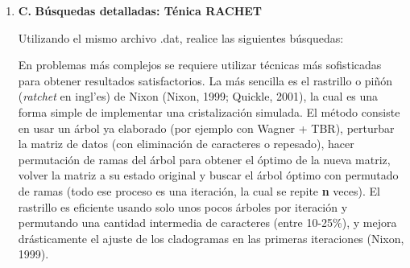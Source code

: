 \begin{itemize}
\begin{enumerate}
 
 
\subsubsection*{Preguntas}
Utilice un manejador gr\'afico que le permita visualizar la tendencia en los datos obtenidos.

¿Encontr\'o alguna tendencia en t\'erminos de tiempos o costos,  al aumentar el n\'umero de replicas?\\


\item{\textbf{C. }}\textbf{B\'usquedas detalladas: T\'enica RACHET}

Utilizando el mismo archivo .dat,  realice las siguientes b\'usquedas:

 \begin{table}[H]
 \centering
 \end{table}

En problemas m\'as complejos se requiere utilizar t\'ecnicas m\'as sofisticadas para obtener resultados satisfactorios. La m\'as sencilla es el rastrillo o pi\~n\'on (\textit{ratchet} en ingl'es) de Nixon {\color{red}(Nixon,  1999; Quickle,  2001)},  la cual es una forma simple de implementar una cristalizaci\'on simulada. El m\'etodo consiste en usar un \'arbol ya elaborado (por ejemplo con Wagner + TBR),  perturbar la matriz de datos (con eliminaci\'on de caracteres o repesado),  hacer permutaci\'on de ramas del \'arbol para obtener el \'optimo de la nueva matriz,  volver la matriz a su estado original y buscar el \'arbol \'optimo con permutado de ramas (todo ese proceso es una iteraci\'on,  la cual se repite \textbf{n} veces). El rastrillo es eficiente usando solo unos pocos \'arboles por iteraci\'on y permutando una cantidad intermedia de caracteres (entre 10-25\%),  y mejora dr\'asticamente el ajuste de los cladogramas en las primeras iteraciones (Nixon,  1999).
 

\end{enumerate}
\end{itemize}
